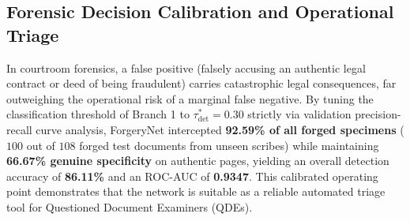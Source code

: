 \documentclass[pdflatex,sn-mathphys-num,iicol]{sn-jnl}
\begin{document}
\subsection{Forensic Decision Calibration and Operational Triage}
In courtroom forensics, a false positive (falsely accusing an authentic legal contract or deed of being fraudulent) carries catastrophic legal consequences, far outweighing the operational risk of a marginal false negative. By tuning the classification threshold of Branch 1 to $\tau_{\text{det}}^* = 0.30$ strictly via validation precision-recall curve analysis, ForgeryNet intercepted \textbf{92.59\% of all forged specimens} ($100$ out of $108$ forged test documents from unseen scribes) while maintaining \textbf{66.67\% genuine specificity} on authentic pages, yielding an overall detection accuracy of \textbf{86.11\%} and an ROC-AUC of \textbf{0.9347}. This calibrated operating point demonstrates that the network is suitable as a reliable automated triage tool for Questioned Document Examiners (QDEs).
\end{document}
